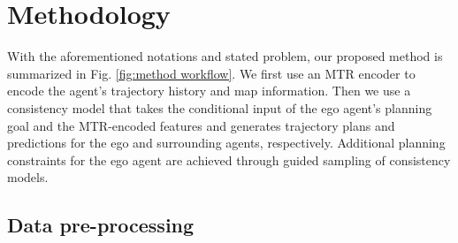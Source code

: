 \section{Methodology}


With the aforementioned notations and stated problem, our proposed method is summarized in Fig. \ref{fig:method workflow}.
We first use an MTR encoder to encode the agent's trajectory history and map information.
Then we use a consistency model that takes the conditional input of the ego agent's planning goal and the MTR-encoded features and generates trajectory plans and predictions for the ego and surrounding agents, respectively.
Additional planning constraints for the ego agent are achieved through guided sampling of consistency models.



\subsection{Data pre-processing}\label{sec: data preprocessing}

